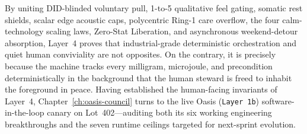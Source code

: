 By uniting DID-blinded voluntary pull, 1-to-5 qualitative feel gating, somatic rest shields, scalar edge acoustic caps, polycentric Ring-1 care overflow, the four calm-technology scaling laws, Zero-Stat Liberation, and asynchronous weekend-detour absorption, Layer~4 proves that industrial-grade deterministic orchestration and quiet human conviviality are not opposites. On the contrary, it is precisely because the machine tracks every milligram, microjoule, and precondition deterministically in the background that the human steward is freed to inhabit the foreground in peace. Having established the human-facing invariants of Layer~4, Chapter~\ref{ch:oasis-council} turns to the live Oasis (\texttt{Layer 1b}) software-in-the-loop canary on Lot~402---auditing both its six working engineering breakthroughs and the seven runtime ceilings targeted for next-sprint evolution.

